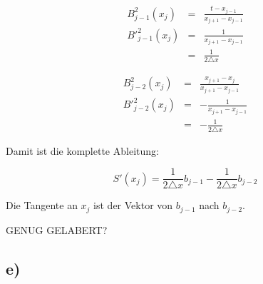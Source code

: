 \begin{eqnarray}
    B^2_{j-1}(x_j) &=& \frac{t - x_{j-1}}{x_{j+1} - x_{j-1}} \\
    B'^2_{j-1}(x_j)&=& \frac{1}{x_{j+1} - x_{j-1}}\\
    &=& \frac{1}{2 \triangle x}
\end{eqnarray}

\begin{eqnarray}
    B^2_{j-2}(x_j)&=& \frac{x_{j+1} - x_{j}}{x_{j+1} - x_{j-1}}\\
    B'^2_{j-2}(x_j)&=& -\frac{1}{x_{j+1} - x_{j-1}}\\
        &=& -\frac{1}{2 \triangle x}
\end{eqnarray}

Damit ist die komplette Ableitung:

\begin{equation}
    S'(x_j) =  \frac{1}{2 \triangle x} b_{j-1} - \frac{1}{2 \triangle x} b_{j-2}
\end{equation}

Die Tangente an $x_j$ ist der Vektor von $b_{j-1}$ nach $b_{j-2}$.

GENUG GELABERT?


\subsection*{e)}


